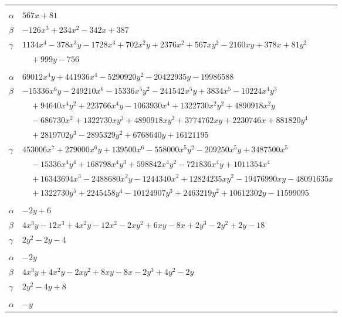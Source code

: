 \documentclass[11pt]{article}
\begin{document}
\begin{longtable}{@{}ll@{}}
\addlinespace[3pt]
\multicolumn{2}{@{}l}{$\{i,j\}=\{6,213\}$, $k_{ij}=2^{2}\cdot 3^{6}$}\\
$\alpha$ & $567x+81$\\
$\beta$ & $-126x^{3}+234x^{2}-342x+387$\\
$\gamma$ & $1134x^{4}-378x^{3}y-1728x^{3}+702x^{2}y+2376x^{2}+567xy^{2}-2160xy+378x+81y^{2}$\\
 & $\quad +999y-756$\\
\addlinespace[3pt]
\multicolumn{2}{@{}l}{$\{i,j\}=\{6,224\}$, $k_{ij}=2^{2}\cdot 3^{6}$}\\
$\alpha$ & $69012x^{4}y+441936x^{4}-5290920y^{2}-20422935y-19986588$\\
$\beta$ & $-15336x^{6}y-249210x^{6}-15336x^{5}y^{2}-241542x^{5}y+3834x^{5}-10224x^{4}y^{3}$\\
 & $\quad +94640x^{4}y^{2}+223766x^{4}y-1063930x^{4}+1322730x^{2}y^{2}+4890918x^{2}y$\\
 & $\quad -686730x^{2}+1322730xy^{3}+4890918xy^{2}+3774762xy+2230746x+881820y^{4}$\\
 & $\quad +2819702y^{3}-2895329y^{2}+6768640y+16121195$\\
$\gamma$ & $453006x^{7}+279000x^{6}y+139500x^{6}-558000x^{5}y^{2}-209250x^{5}y+3487500x^{5}$\\
 & $\quad -15336x^{4}y^{4}+168798x^{4}y^{3}+598842x^{4}y^{2}-721836x^{4}y+1011354x^{4}$\\
 & $\quad +16343694x^{3}-2488680x^{2}y-1244340x^{2}+12824235xy^{2}-19476990xy-48091635x$\\
 & $\quad +1322730y^{5}+2245458y^{4}-10124907y^{3}+2463219y^{2}+10612302y-11599095$\\
\addlinespace[3pt]
\multicolumn{2}{@{}l}{$\{i,j\}=\{8,12\}$, $k_{ij}=2^{5}$}\\
$\alpha$ & $-2y+6$\\
$\beta$ & $4x^{3}y-12x^{3}+4x^{2}y-12x^{2}-2xy^{2}+6xy-8x+2y^{3}-2y^{2}+2y-18$\\
$\gamma$ & $2y^{2}-2y-4$\\
\addlinespace[3pt]
\multicolumn{2}{@{}l}{$\{i,j\}=\{8,43\}$, $k_{ij}=2^{3}$}\\
$\alpha$ & $-2y$\\
$\beta$ & $4x^{3}y+4x^{2}y-2xy^{2}+8xy-8x-2y^{3}+4y^{2}-2y$\\
$\gamma$ & $2y^{2}-4y+8$\\
\addlinespace[3pt]
\multicolumn{2}{@{}l}{$\{i,j\}=\{8,62\}$, $k_{ij}=2^{2}$}\\
$\alpha$ & $-y$\\

\end{longtable}
\end{document}
